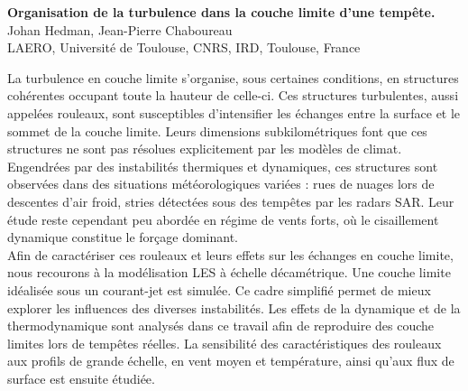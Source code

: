
\usepackage[style=authoryear, backend=biber]{biblatex}

\graphicspath{{FIGURES/}}

\usepackage{setspace}
\usepackage{lineno}


\doublespacing
\linenumbers

\noindent \textbf{Organisation de la turbulence dans la couche limite d'une tempête. \\}
Johan Hedman, Jean-Pierre Chaboureau \\
LAERO, Université de Toulouse, CNRS, IRD, Toulouse, France \\
\bigskip 

La turbulence en couche limite s’organise, sous certaines conditions, en structures cohérentes occupant toute la hauteur de celle-ci. Ces structures turbulentes, aussi appelées rouleaux, sont susceptibles d'intensifier les échanges entre la surface et le sommet de la couche limite. Leurs dimensions subkilométriques font que ces structures ne sont pas résolues explicitement par les modèles de climat.\\

Engendrées par des instabilités thermiques et dynamiques, ces structures sont observées dans des situations météorologiques variées : rues de nuages lors de descentes d'air froid, stries détectées sous des tempêtes par les radars SAR. Leur étude reste cependant peu abordée en régime de vents forts, où le cisaillement dynamique constitue le forçage dominant.\\
 
Afin de caractériser ces rouleaux et leurs effets sur les échanges en couche limite, nous recourons à la modélisation LES à échelle décamétrique. Une couche limite idéalisée sous un courant-jet est simulée. Ce cadre simplifié permet de mieux explorer les influences des diverses instabilités. Les effets de la dynamique et de la thermodynamique sont analysés dans ce travail afin de reproduire des couche limites lors de tempêtes réelles. La sensibilité des caractéristiques des rouleaux aux profils de grande échelle, en vent moyen et température, ainsi qu'aux flux de surface est ensuite étudiée.  


